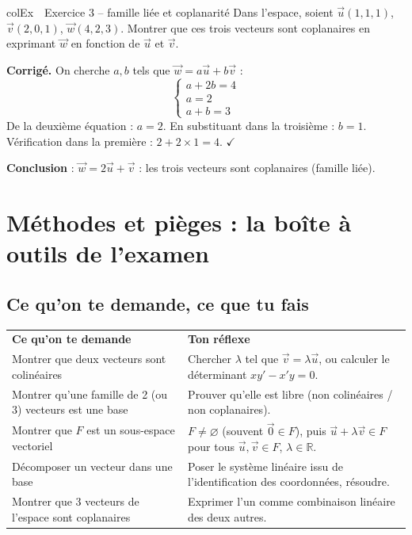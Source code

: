 \documentclass[11pt,a4paper]{article}
\newenvironment{exemple}[1][Exemple]
  {\begin{fiche}{colEx}{\ding{217}~~#1}}{\end{fiche}}
\begin{document}
\begin{exemple}[Exercice 3 -- famille liée et coplanarité]
Dans l'espace, soient $\vec u(1,1,1)$, $\vec v(2,0,1)$, $\vec w(4,2,3)$. Montrer que ces trois vecteurs sont coplanaires en exprimant $\vec w$ en fonction de $\vec u$ et $\vec v$.

\smallskip
\textbf{Corrigé.} On cherche $a,b$ tels que $\vec w=a\vec u+b\vec v$ :
\[
  \begin{cases} a+2b=4 \\ a=2 \\ a+b=3 \end{cases}
\]
De la deuxième équation : $a=2$. En substituant dans la troisième : $b=1$. Vérification dans la première : $2+2\times1=4$. $\checkmark$

\smallskip
\textbf{Conclusion} : $\vec w=2\vec u+\vec v$ : les trois vecteurs sont coplanaires (famille liée).
\end{exemple}

\section{Méthodes et pièges : la boîte à outils de l'examen}

\subsection{Ce qu'on te demande, ce que tu fais}

\begin{center}
\renewcommand{\arraystretch}{1.45}
\sffamily\small
\begin{tabular}{>{\raggedright\arraybackslash}p{7.2cm} >{\raggedright\arraybackslash}p{8cm}}
\rowcolor{qtealdark} \color{white}\bfseries Ce qu'on te demande & \color{white}\bfseries Ton réflexe \\
\rowcolor{tealpale} Montrer que deux vecteurs sont colinéaires & Chercher $\lambda$ tel que $\vec v=\lambda\vec u$, ou calculer le déterminant $xy'-x'y=0$. \\
Montrer qu'une famille de 2 (ou 3) vecteurs est une base & Prouver qu'elle est libre (non colinéaires / non coplanaires). \\
\rowcolor{tealpale} Montrer que $F$ est un sous-espace vectoriel & $F\ne\varnothing$ (souvent $\vec0\in F$), puis $\vec u+\lambda\vec v\in F$ pour tous $\vec u,\vec v\in F$, $\lambda\in\mathbb{R}$. \\
Décomposer un vecteur dans une base & Poser le système linéaire issu de l'identification des coordonnées, résoudre. \\
\rowcolor{tealpale} Montrer que 3 vecteurs de l'espace sont coplanaires & Exprimer l'un comme combinaison linéaire des deux autres. \\
\end{tabular}
\end{center}
\end{document}
